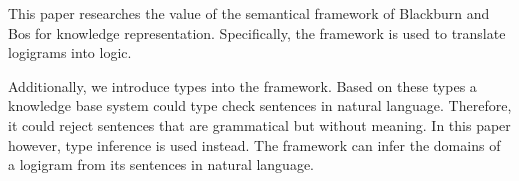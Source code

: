 This paper researches the value of the semantical framework of Blackburn and Bos for knowledge representation. Specifically, the framework is used to translate logigrams into logic. %

Additionally, we introduce types into the framework. Based on these types a knowledge base system could type check sentences in natural language. Therefore, it could reject sentences that are grammatical but without meaning. In this paper however, type inference is used instead. The framework can infer the domains of a logigram from its sentences in natural language.


